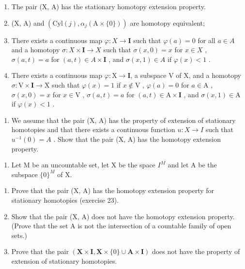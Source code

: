 \begin{enumerate}
\def\labelenumi{(\roman{enumi})}
\item
  The pair (X, A) has the stationary homotopy extension property.
\item
  (X, A) and \((\mathrm{Cyl}(j), \alpha_{j}(\mathrm{A} \times \{0\}))\) are homotopy equivalent;
\item
  There exists a continuous map \(\varphi\colon X\to\mathbf{I}\) such that \(\varphi(a)=0\) for all \(a\in A\) and a homotopy \(\sigma\colon X\times\mathbf{I}\to X\) such that \(\sigma(x,0)=x\) for \(x\in X\) , \(\sigma(a,t)=a\) for \((a,t)\in A\times\mathbf{I}\) , and \(\sigma(x,1)\in A\) if \(\varphi(x)<1\) .
\item
  There exists a continuous map \(\varphi\colon\mathrm{X}\to\mathbf{I}\), a subspace V of X, and a homotopy \(\sigma\colon\mathrm{V}\times\mathbf{I}\to\mathrm{X}\) such that \(\varphi(x)=1\) if \(x\notin\mathrm{V}\) , \(\varphi(a)=0\) for \(a\in\mathrm{A}\) , \(\sigma(x,0)=x\) for \(x\in\mathrm{V}\) , \(\sigma(a,t)=a\) for \((a,t)\in\mathrm{A}\times\mathbf{I}\) , and \(\sigma(x,1)\in\mathrm{A}\) if \(\varphi(x)<1\) .
\end{enumerate}

\begin{enumerate}
\def\labelenumi{\alph{enumi})}
\setcounter{enumi}{1}
\tightlist
\item
  We assume that the pair (X, A) has the property of extension of stationary homotopies and that there exists a continuous function \(u \colon X \to I\) such that \(u^{-1}(0) = A\) . Show that the pair (X, A) has the homotopy extension property.
\end{enumerate}

\begin{enumerate}
\def\labelenumi{\arabic{enumi})}
\setcounter{enumi}{23}
\tightlist
\item
  Let M be an uncountable set, let X be the space \(I^{M}\) and let A be the subspace \(\{0\}^{M}\) of X.
\end{enumerate}

\begin{enumerate}
\def\labelenumi{\alph{enumi})}
\item
  Prove that the pair (X, A) has the homotopy extension property for stationary homotopies (exercise 23).
\item
  Show that the pair (X, A) does not have the homotopy extension property. (Prove that the set A is not the intersection of a countable family of open sets.)
\item
  Prove that the pair \((\mathbf{X} \times \mathbf{I}, \mathbf{X} \times \{0\} \cup \mathbf{A} \times \mathbf{I})\) does not have the property of extension of stationary homotopies.
\end{enumerate}

